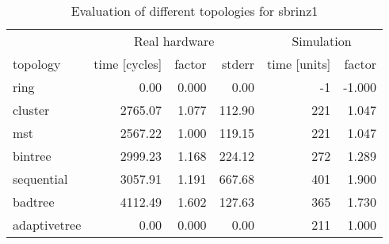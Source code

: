 \begin{table}[htb]
  \centering
  \begin{tabular}{lrrrrr}
  \toprule
  & \multicolumn{3}{c}{Real hardware} & \multicolumn{2}{c}{Simulation} \\
  topology & time [cycles] & factor & stderr & time [units] & factor \\
  \midrule
  ring & 0.00 & 0.000 & 0.00 & -1 & -1.000 \\
  cluster & 2765.07 & 1.077 & 112.90 & 221 & 1.047 \\
  mst & 2567.22 & 1.000 & 119.15 & 221 & 1.047 \\
  bintree & 2999.23 & 1.168 & 224.12 & 272 & 1.289 \\
  sequential & 3057.91 & 1.191 & 667.68 & 401 & 1.900 \\
  badtree & 4112.49 & 1.602 & 127.63 & 365 & 1.730 \\
  adaptivetree & 0.00 & 0.000 & 0.00 & 211 & 1.000 \\
  \midrule
  \end{tabular}
  \caption{Evaluation of different topologies for sbrinz1}
  \label{tab:sbrinz1}
\end{table}
